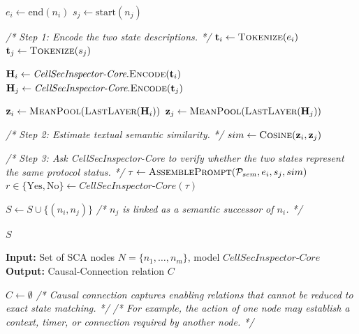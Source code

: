 \documentclass[sigconf]{acmart}
\newcommand{\core}{\textit{CellSecInspector-Core}\xspace}
\begin{document}
{\begin{algorithm}[ht]
\begin{algorithmic}[1]
    \State $e_i \leftarrow \text{end}(n_i)$
    \State $s_j \leftarrow \text{start}(n_j)$


        \State \textit{/* Step 1: Encode the two state descriptions. */}
        \State $\mathbf{t}_i \leftarrow \textsc{Tokenize}(e_i)$
        \State $\mathbf{t}_j \leftarrow \textsc{Tokenize}(s_j)$

        \State $\mathbf{H}_i \leftarrow \core.\textsc{Encode}(\mathbf{t}_i)$
        \State $\mathbf{H}_j \leftarrow \core.\textsc{Encode}(\mathbf{t}_j)$

        \State $\mathbf{z}_i \leftarrow \textsc{MeanPool}(\textsc{LastLayer}(\mathbf{H}_i))$
        \State $\mathbf{z}_j \leftarrow \textsc{MeanPool}(\textsc{LastLayer}(\mathbf{H}_j))$

        \State \textit{/* Step 2: Estimate textual semantic similarity. */}
        \State $sim \leftarrow \textsc{Cosine}(\mathbf{z}_i,\mathbf{z}_j)$

        \State \textit{/* Step 3: Ask \core to verify whether the two states represent the same protocol status. */}
        \State $\tau \leftarrow \textsc{AssemblePrompt}(\mathcal{P}_{sem}, e_i, s_j, sim)$
        \State $r \in \{\text{Yes},\text{No}\} \leftarrow \core(\tau)$

            \State $S \leftarrow S \cup \{(n_i,n_j)\}$
            \State \textit{/* $n_j$ is linked as a semantic successor of $n_i$. */}
        \EndIf

    \EndIf

\EndFor

\State \Return $S$

\end{algorithmic}
\end{algorithm}

\begin{algorithm}[ht]
\caption{Causal Connection}
\label{alg:causal_connection}
\scriptsize
\begin{algorithmic}[1]

\State \textbf{Input:} Set of SCA nodes $N=\{n_1,\dots,n_m\}$, model $\core$
\State \textbf{Output:} Causal-Connection relation $C$

\State $C \leftarrow \emptyset$
\State \textit{/* Causal connection captures enabling relations that cannot be reduced to exact state matching. */}
\State \textit{/* For example, the action of one node may establish a context, timer, or connection required by another node. */}


\end{algorithmic}
\end{algorithm}}
\end{document}
